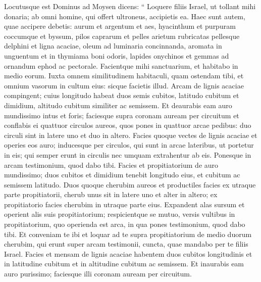 \begin{biblechapter}
\begin{biblechapter}
\begin{biblechapter}
\begin{biblechapter}
\begin{biblechapter}
\begin{biblechapter}
\begin{biblechapter}
\begin{biblechapter}
\begin{biblechapter}
\begin{biblechapter}
\begin{biblechapter}
\begin{biblechapter}
\begin{biblechapter}
\begin{biblechapter}
\begin{biblechapter}
\begin{biblechapter}
\begin{biblechapter}
\begin{biblechapter}
\begin{biblechapter}
\begin{biblechapter}
\begin{biblechapter}
\begin{biblechapter}
\begin{biblechapter}
\begin{biblechapter}
\begin{biblechapter}
\verse Locutusque est Dominus ad Moysen dicens: 
\verse “ Loquere filiis Israel, ut tollant mihi donaria; ab omni homine, qui offert ultroneus, accipietis ea. 
 \verse Haec sunt autem, quae accipere debetis: aurum et argentum et aes, 
\verse hyacinthum et purpuram coccumque et byssum, pilos caprarum 
\verse et pelles arietum rubricatas pellesque delphini et ligna acaciae, 
\verse oleum ad luminaria concinnanda, aromata in unguentum et in thymiama boni odoris, 
\verse lapides onychinos et gemmas ad ornandum ephod ac pectorale. 
\verse Facientque mihi sanctuarium, et habitabo in medio eorum. 
\verse Iuxta omnem similitudinem habitaculi, quam ostendam tibi, et omnium vasorum in cultum eius: sicque facietis illud.
 \verse Arcam de lignis acaciae compingent; cuius longitudo habeat duos semis cubitos, latitudo cubitum et dimidium, altitudo cubitum similiter ac semissem. 
\verse Et deaurabis eam auro mundissimo intus et foris; faciesque supra coronam auream per circuitum 
\verse et conflabis ei quattuor circulos aureos, quos pones in quattuor arcae pedibus: duo circuli sint in latere uno et duo in altero. 
 \verse Facies quoque vectes de lignis acaciae et operies eos auro; 
\verse inducesque per circulos, qui sunt in arcae lateribus, ut portetur in eis; 
\verse qui semper erunt in circulis nec umquam extrahentur ab eis. 
\verse Ponesque in arcam testimonium, quod dabo tibi.
 \verse Facies et propitiatorium de auro mundissimo; duos cubitos et dimidium tenebit longitudo eius, et cubitum ac semissem latitudo. 
\verse Duos quoque cherubim aureos et productiles facies ex utraque parte propitiatorii, 
\verse cherub unus sit in latere uno et alter in altero; ex propitiatorio facies cherubim in utraque parte eius. 
\verse Expandent alas sursum et operient alis suis propitiatorium; respicientque se mutuo, versis vultibus in propitiatorium, 
 \verse quo operienda est arca, in qua pones testimonium, quod dabo tibi. 
\verse Et conveniam te ibi et loquar ad te supra propitiatorium de medio duorum cherubim, qui erunt super arcam testimonii, cuncta, quae mandabo per te filiis Israel.
 \verse Facies et mensam de lignis acaciae habentem duos cubitos longitudinis et in latitudine cubitum et in altitudine cubitum ac semissem. 
\verse Et inaurabis eam auro purissimo; faciesque illi coronam auream per circuitum. 

\end{biblechapter}
\end{biblechapter}
\end{biblechapter}
\end{biblechapter}
\end{biblechapter}
\end{biblechapter}
\end{biblechapter}
\end{biblechapter}
\end{biblechapter}
\end{biblechapter}
\end{biblechapter}
\end{biblechapter}
\end{biblechapter}
\end{biblechapter}
\end{biblechapter}
\end{biblechapter}
\end{biblechapter}
\end{biblechapter}
\end{biblechapter}
\end{biblechapter}
\end{biblechapter}
\end{biblechapter}
\end{biblechapter}
\end{biblechapter}
\end{biblechapter}
